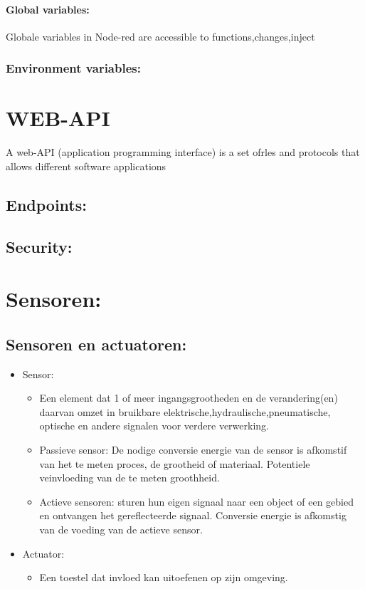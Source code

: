 \documentclass[12pt]{article}
\begin{document}
\paragraph{Global variables:}
Globale variables in Node-red are accessible  to functions,changes,inject
\subsubsection{Environment variables:}
\section{WEB-API}
A web-API (application programming interface) is a set ofrles and protocols that allows different software applications 
\subsection{Endpoints:}
\subsection{Security:}
\section{Sensoren:}
\subsection{Sensoren en actuatoren:}
\begin{itemize}
    \item Sensor:\begin{itemize}
        \item[]Een element dat 1 of meer ingangsgrootheden en de verandering(en) daarvan omzet in bruikbare elektrische,hydraulische,pneumatische, optische en andere signalen voor verdere verwerking.
        \item Passieve sensor: De nodige conversie energie van de sensor is afkomstif van het te meten proces, de grootheid of materiaal. Potentiele veinvloeding van de te meten groothheid.
        \item Actieve sensoren: sturen hun eigen signaal naar een object of een gebied en ontvangen het gereflecteerde signaal. Conversie energie is afkomstig van de voeding van de actieve sensor.
    \end{itemize}
    \item Actuator:\begin{itemize}
        \item Een toestel dat invloed kan uitoefenen op zijn omgeving.
    \end{itemize}
\end{itemize}
\end{document}

